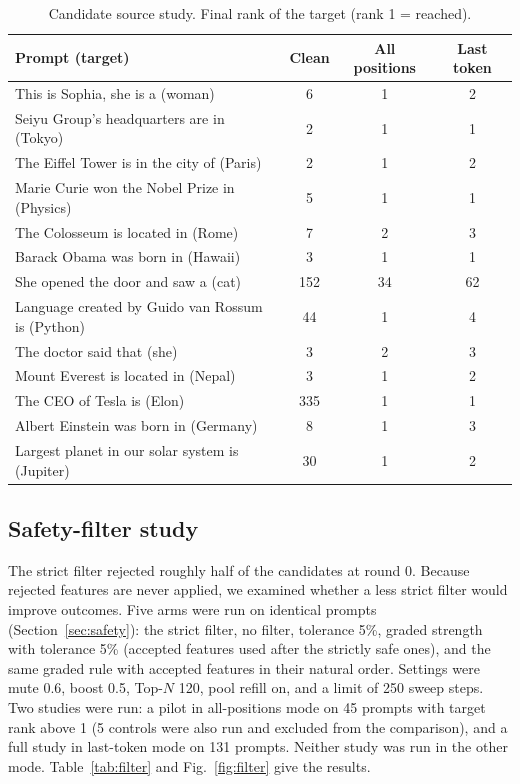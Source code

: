 \documentclass[conference]{IEEEtran}
\begin{document}
\begin{table}[t]
\caption{Candidate source study. Final rank of the target (rank 1 = reached).}
\label{tab:candsrc}
\centering\footnotesize
\begin{tabular}{@{}lccc@{}}
\toprule
Prompt (target) & Clean & All positions & Last token\\
\midrule
This is Sophia, she is a (woman) & 6 & 1 & 2\\
Seiyu Group's headquarters are in (Tokyo) & 2 & 1 & 1\\
The Eiffel Tower is in the city of (Paris) & 2 & 1 & 2\\
Marie Curie won the Nobel Prize in (Physics) & 5 & 1 & 1\\
The Colosseum is located in (Rome) & 7 & 2 & 3\\
Barack Obama was born in (Hawaii) & 3 & 1 & 1\\
She opened the door and saw a (cat) & 152 & 34 & 62\\
Language created by Guido van Rossum is (Python) & 44 & 1 & 4\\
The doctor said that (she) & 3 & 2 & 3\\
Mount Everest is located in (Nepal) & 3 & 1 & 2\\
The CEO of Tesla is (Elon) & 335 & 1 & 1\\
Albert Einstein was born in (Germany) & 8 & 1 & 3\\
Largest planet in our solar system is (Jupiter) & 30 & 1 & 2\\
\bottomrule
\end{tabular}
\end{table}

\subsection{Safety-filter study}
\label{sec:filter}
The strict filter rejected roughly half of the candidates at round 0. Because rejected features are never applied, we examined whether a less strict filter would improve outcomes. Five arms were run on identical prompts (Section~\ref{sec:safety}): the strict filter, no filter, tolerance 5\%, graded strength with tolerance 5\% (accepted features used after the strictly safe ones), and the same graded rule with accepted features in their natural order. Settings were mute 0.6, boost 0.5, Top-$N$ 120, pool refill on, and a limit of 250 sweep steps. Two studies were run: a pilot in all-positions mode on 45 prompts with target rank above 1 (5 controls were also run and excluded from the comparison), and a full study in last-token mode on 131 prompts. Neither study was run in the other mode. Table~\ref{tab:filter} and Fig.~\ref{fig:filter} give the results.
\end{document}
